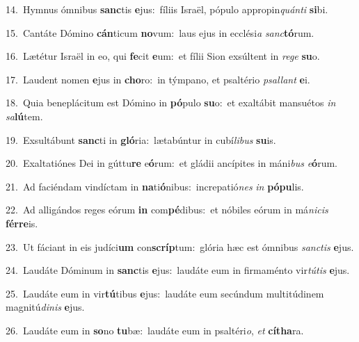 {\numbfont\textcolor{\numbcolor}{14.}}~Hymnus ómnibus \textbf{sanc}\-tis \textbf{e}\-jus:~\star fíliis Israël, pópulo appropin\-\textit{quán}\-\textit{ti} \textbf{si}\-bi.\par
{\numbfont\textcolor{\numbcolor}{15.}}~Cantáte Dómino \textbf{cán}\-ticum \textbf{no}\-vum:~\star laus ejus in ecclési\textit{a} \textit{sanc}\-\textbf{tó}rum.\par
{\numbfont\textcolor{\numbcolor}{16.}}~Lætétur Israël in eo, qui \textbf{fe}\-cit \textbf{e}\-um:~\star et fílii Sion exsúltent in \textit{re}\-\textit{ge} \textbf{su}\-o.\par
{\numbfont\textcolor{\numbcolor}{17.}}~Laudent nomen \textbf{e}\-jus in \textbf{cho}\-ro:~\star in týmpano, et psaltério \textit{psal}\-\textit{lant} \textbf{e}\-i.\par
{\numbfont\textcolor{\numbcolor}{18.}}~Quia beneplácitum est Dómino in \textbf{pó}\-pulo \textbf{su}\-o:~\star et exaltábit mansuétos \textit{in} \textit{sa}\-\textbf{lú}tem.\par
{\numbfont\textcolor{\numbcolor}{19.}}~Exsultábunt \textbf{sanc}\-ti in \textbf{gló}\-ria:~\star lætabúntur in cubí\-\textit{li}\-\textit{bus} \textbf{su}\-is.\par
{\numbfont\textcolor{\numbcolor}{20.}}~Exaltatiónes Dei in gúttu\textbf{re} e\-\textbf{ó}\-rum:~\star et gládii ancípites in máni\textit{bus} \textit{e}\-\textbf{ó}rum.\par
{\numbfont\textcolor{\numbcolor}{21.}}~Ad faciéndam vindíctam in \textbf{na}\-ti\-\textbf{ó}\-nibus:~\star increpatió\textit{nes} \textit{in} \textbf{pó}\-\textbf{pu}lis.\par
{\numbfont\textcolor{\numbcolor}{22.}}~Ad alligándos reges eórum \textbf{in} com\-\textbf{pé}\-dibus:~\star et nóbiles eórum in má\-\textit{ni}\-\textit{cis} \textbf{fér}\-\textbf{re}is.\par
{\numbfont\textcolor{\numbcolor}{23.}}~Ut fáciant in eis judíci\textbf{um} con\-\textbf{scríp}\-tum:~\star glória hæc est ómnibus \textit{sanc}\-\textit{tis} \textbf{e}\-jus.\par
{\numbfont\textcolor{\numbcolor}{24.}}~Laudáte Dóminum in \textbf{sanc}\-tis \textbf{e}\-jus:~\star laudáte eum in firmaménto vir\-\textit{tú}\-\textit{tis} \textbf{e}\-jus.\par
{\numbfont\textcolor{\numbcolor}{25.}}~Laudáte eum in vir\-\textbf{tú}\-tibus \textbf{e}\-jus:~\star laudáte eum secúndum multitúdinem magnitú\-\textit{di}\-\textit{nis} \textbf{e}\-jus.\par
{\numbfont\textcolor{\numbcolor}{26.}}~Laudáte eum in \textbf{so}\-no \textbf{tu}\-bæ:~\star laudáte eum in psaltéri\-\textit{o}\-, \textit{et} \textbf{cí}\-\textbf{tha}ra.\par
